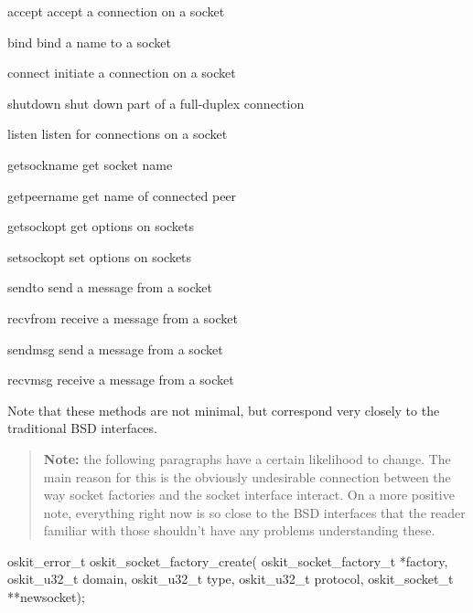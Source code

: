 \begin{csymlist}
\item[accept]	
	accept a connection on a socket

\item[bind]
	bind a name to a socket

\item[connect]
	initiate a connection on a socket

\item[shutdown]
	shut down part of a full-duplex connection

\item[listen]
	listen for connections on a socket	

\item[getsockname]
	get socket name

\item[getpeername]
	get name of connected peer

\item[getsockopt]
	get options on sockets

\item[setsockopt]
	set options on sockets

\item[sendto]
	send a message from a socket

\item[recvfrom]
	receive a message from a socket

\item[sendmsg]
	send a message from a socket

\item[recvmsg]
	receive a message from a socket

\end{csymlist}

	Note that these methods are not minimal, but correspond very 
    closely to the traditional BSD interfaces.

    \begin{quote}
	{\bf Note:} the following paragraphs have a certain likelihood
	to change. The main reason for this is the obviously undesirable
	connection between the way socket factories and the socket interface
	interact. On a more positive note, everything right now is so
	close to the BSD interfaces that the reader familiar with those
	shouldn't have any problems understanding these.
    \end{quote}

\begin{apisyn}

	\funcproto oskit_error_t 
		oskit_socket_factory_create(
		    oskit_socket_factory_t *factory,
		    oskit_u32_t domain, 
		    oskit_u32_t type, 
		    oskit_u32_t protocol,
		    \outparam oskit_socket_t **newsocket);
\end{apisyn}

